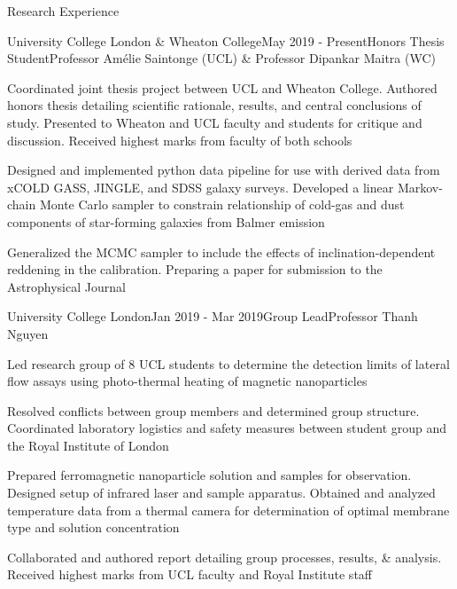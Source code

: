 \documentclass{resume} %
\begin{document}
\begin{rSection}{Research Experience}
\begin{rSubsection}{University College London \& Wheaton College}{May 2019 - Present}{Honors Thesis Student}{Professor Am\'{e}lie Saintonge (UCL) \& Professor Dipankar Maitra (WC)}

\item Coordinated joint thesis project between UCL and Wheaton College. Authored honors thesis detailing scientific rationale, results, and central conclusions of study. Presented to Wheaton and UCL faculty and students for critique and discussion. Received highest marks from faculty of both schools
\item Designed and implemented python data pipeline for use with derived data from xCOLD GASS, JINGLE, and SDSS galaxy surveys. Developed a linear Markov-chain Monte Carlo sampler to constrain relationship of cold-gas and dust components of star-forming galaxies from Balmer emission
\item Generalized the MCMC sampler to include the effects of inclination-dependent reddening in the calibration. Preparing a paper for submission to the Astrophysical Journal
\end{rSubsection}

\begin{rSubsection}{University College London}{Jan 2019 - Mar 2019}{Group Lead}{Professor Thanh Nguyen}
\item Led research group of 8 UCL students to determine the detection limits of lateral flow assays using photo-thermal heating of magnetic nanoparticles
\item Resolved conflicts between group members and determined group structure. Coordinated laboratory logistics and safety measures between student group and the Royal Institute of London
\item Prepared ferromagnetic nanoparticle solution and samples for observation. Designed setup of infrared laser and sample apparatus. Obtained and analyzed temperature data from a thermal camera for determination of optimal membrane type and solution concentration
\item Collaborated and authored report detailing group processes, results, \& analysis. Received highest marks from UCL faculty and Royal Institute staff
\end{rSubsection}


\end{rSection}
\end{document}
